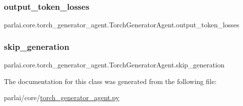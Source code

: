 \subsubsection{\texorpdfstring{output\+\_\+token\+\_\+losses}{output\_token\_losses}}
{\footnotesize\ttfamily parlai.\+core.\+torch\+\_\+generator\+\_\+agent.\+Torch\+Generator\+Agent.\+output\+\_\+token\+\_\+losses}

\mbox{\label{classparlai_1_1core_1_1torch__generator__agent_1_1TorchGeneratorAgent_a713b4b7ae6d30a664c97c4ea121f8e38}} 
\subsubsection{\texorpdfstring{skip\+\_\+generation}{skip\_generation}}
{\footnotesize\ttfamily parlai.\+core.\+torch\+\_\+generator\+\_\+agent.\+Torch\+Generator\+Agent.\+skip\+\_\+generation}



The documentation for this class was generated from the following file\+:\begin{DoxyCompactItemize}
\item 
parlai/core/\hyperlink{torch__generator__agent_8py}{torch\+\_\+generator\+\_\+agent.\+py}\end{DoxyCompactItemize}
